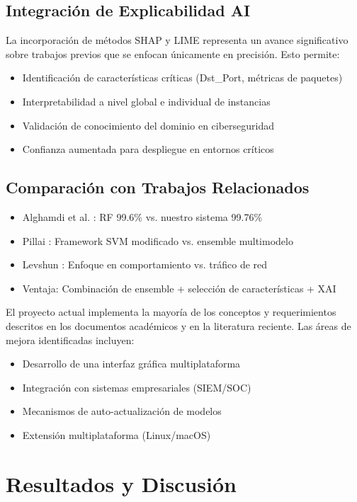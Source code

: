 \documentclass[conference]{IEEEtran}
\begin{document}
\subsection{Integración de Explicabilidad AI}
La incorporación de métodos SHAP y LIME representa un avance significativo sobre trabajos previos que se enfocan únicamente en precisión. Esto permite:
\begin{itemize}
    \item Identificación de características críticas (Dst\_Port, métricas de paquetes)
    \item Interpretabilidad a nivel global e individual de instancias
    \item Validación de conocimiento del dominio en ciberseguridad
    \item Confianza aumentada para despliegue en entornos críticos
\end{itemize}

\subsection{Comparación con Trabajos Relacionados}
\begin{itemize}
    \item Alghamdi et al. \cite{alghamdi2019}: RF 99.6\% vs. nuestro sistema 99.76\%
    \item Pillai \cite{pillai2019}: Framework SVM modificado vs. ensemble multimodelo
    \item Levshun \cite{levshun2023}: Enfoque en comportamiento vs. tráfico de red
    \item Ventaja: Combinación de ensemble + selección de características + XAI
\end{itemize}

El proyecto actual implementa la mayoría de los conceptos y requerimientos descritos en los documentos académicos y en la literatura reciente. Las áreas de mejora identificadas incluyen:
\begin{itemize}
    \item Desarrollo de una interfaz gráfica multiplataforma
    \item Integración con sistemas empresariales (SIEM/SOC)
    \item Mecanismos de auto-actualización de modelos
    \item Extensión multiplataforma (Linux/macOS)
\end{itemize}

\section{Resultados y Discusión}
\end{document}
